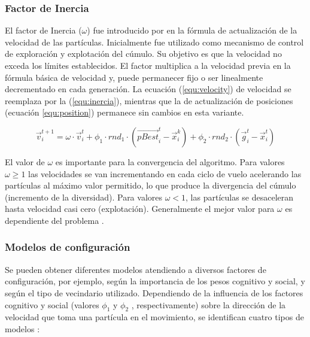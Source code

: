     \subsubsection{Factor de Inercia}

    El factor de Inercia ($\omega$) fue introducido por \cite{citeulike33} en la f\'ormula de actualizaci\'on de 
    la velocidad de las part\'iculas. Inicialmente fue utilizado como mecanismo de control de exploraci\'on y explotaci\'on 
    del c\'umulo. Su objetivo es que la velocidad no exceda los l\'imites establecidos. El factor multiplica a la velocidad 
    previa en la f\'ormula b\'asica de velocidad y, puede permanecer fijo o ser linealmente decrementado en cada generaci\'on. 
    La ecuaci\'on (\ref{equ:velocity}) de velocidad se reemplaza por la (\ref{equ:inercia}), mientras que la de actualizaci\'on de 
    posiciones (ecuaci\'on \ref{equ:position}) permanece sin cambios en esta variante.

     \begin{equation}
	  \vec{v}^{t+1}_{i} = \omega \cdot \vec{v}^t_i + \phi_1 \cdot rnd_1 \cdot \left(\vec{pBest}^t_i - \vec{x}^k_i \right) 
					    + \phi_2 \cdot rnd_2 \cdot \left(\vec{g}^t_i - \vec{x}^t_i \right) 
      \label{equ:inercia}
      \end{equation}
    
    El valor de $\omega$ es importante para la convergencia del algoritmo. Para valores $\omega \geq 1$ las velocidades se 
    van incrementando en cada ciclo de vuelo acelerando las part\'iculas al m\'aximo valor permitido, lo que produce la 
    divergencia del c\'umulo (incremento de la diversidad). Para valores $\omega < 1$, las part\'iculas se desaceleran 
    hasta velocidad casi cero (explotaci\'on). Generalmente el mejor valor para $\omega$ es dependiente del problema 
    \cite{Shi_Eberhart_1998}.

    \subsubsection{Modelos de configuraci\'on}
    
    Se pueden obtener diferentes modelos atendiendo a diversos factores de configuraci\'on, por ejemplo, seg\'un la importancia de los 
    pesos cognitivo y social, y seg\'un el tipo de vecindario utilizado. Dependiendo de la influencia de los factores cognitivo y social 
    (valores $\phi_1$ y $\phi_2$ , respectivamente) sobre la direcci\'on de la velocidad que toma una part\'icula en el movimiento, se 
    identifican cuatro tipos de modelos \cite{JKennedy11}:
    
